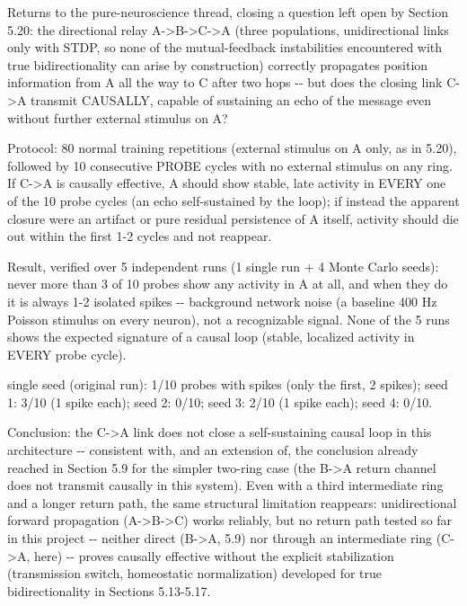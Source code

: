 \documentclass[
  english,
]{article}
\newcounter{none} %
\begin{document}
Returns to the pure-neuroscience thread, closing a question left open by Section 5.20: the directional relay A-\textgreater B-\textgreater C-\textgreater A (three populations, unidirectional links only with STDP, so none of the mutual-feedback instabilities encountered with true bidirectionality can arise by construction) correctly propagates position information from A all the way to C after two hops -\/- but does the closing link C-\textgreater A transmit CAUSALLY, capable of sustaining an echo of the message even without further external stimulus on A?

Protocol: 80 normal training repetitions (external stimulus on A only, as in 5.20), followed by 10 consecutive PROBE cycles with no external stimulus on any ring. If C-\textgreater A is causally effective, A should show stable, late activity in EVERY one of the 10 probe cycles (an echo self-sustained by the loop); if instead the apparent closure were an artifact or pure residual persistence of A itself, activity should die out within the first 1-2 cycles and not reappear.

Result, verified over 5 independent runs (1 single run + 4 Monte Carlo seeds): never more than 3 of 10 probes show any activity in A at all, and when they do it is always 1-2 isolated spikes -\/- background network noise (a baseline 400 Hz Poisson stimulus on every neuron), not a recognizable signal. None of the 5 runs shows the expected signature of a causal loop (stable, localized activity in EVERY probe cycle).

single seed (original run): 1/10 probes with spikes (only the first, 2 spikes); seed 1: 3/10 (1 spike each); seed 2: 0/10; seed 3: 2/10 (1 spike each); seed 4: 0/10.

Conclusion: the C-\textgreater A link does not close a self-sustaining causal loop in this architecture -\/- consistent with, and an extension of, the conclusion already reached in Section 5.9 for the simpler two-ring case (the B-\textgreater A return channel does not transmit causally in this system). Even with a third intermediate ring and a longer return path, the same structural limitation reappears: unidirectional forward propagation (A-\textgreater B-\textgreater C) works reliably, but no return path tested so far in this project -\/- neither direct (B-\textgreater A, 5.9) nor through an intermediate ring (C-\textgreater A, here) -\/- proves causally effective without the explicit stabilization (transmission switch, homeostatic normalization) developed for true bidirectionality in Sections 5.13-5.17.
\end{document}
